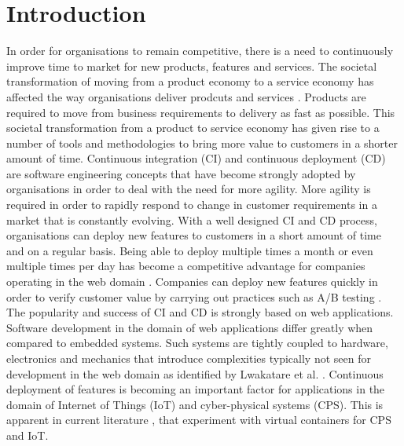 \iffalse  \fi

\chapter{Introduction}
In order for organisations to remain competitive, there is a need to continuously improve time to market for new products, features and services. The societal transformation of moving from a product economy to a service economy has affected the way organisations deliver prodcuts and services \cite{mckinsey}. Products are required to move from business requirements to delivery as fast as possible. This societal transformation from a product to service economy has given rise to a number of tools and methodologies to bring more value to customers in a shorter amount of time. Continuous integration (CI) and continuous deployment (CD) are software engineering concepts that have become strongly adopted by organisations in order to deal with the need for more agility. More agility is required in order to rapidly respond to change in customer requirements in a market that is constantly evolving. With a well designed CI and CD process, organisations can deploy new features to customers in a short amount of time and on a regular basis. Being able to deploy multiple times a month or even multiple times per day has become a competitive advantage for companies operating in the web domain \cite{facebook}. Companies can deploy new features quickly in order to verify customer value by carrying out practices such as A/B testing \cite{abtest}. The popularity and success of CI and CD is strongly based on web applications. Software development in the domain of web applications differ greatly when compared to embedded systems. Such systems are tightly coupled to hardware, electronics and mechanics that introduce complexities typically not seen for development in the web domain as identified by Lwakatare et al. \cite{7427859}. Continuous deployment of features is becoming an important factor for applications in the domain of Internet of Things (IoT) and cyber-physical systems (CPS). This is apparent in current literature \cite{gonz,cberger,2iot}, that experiment with virtual containers for CPS and IoT. \\

